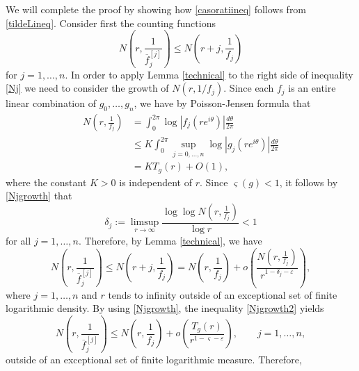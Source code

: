 \documentclass{amsart}
\theoremstyle{definition}
\numberwithin{equation}{section}
\numberwithin{theorem}{section}
\begin{document}
We will complete the proof by showing how \eqref{casoratiineq} follows from \eqref{tildeLineq}. Consider first the counting functions
    \begin{equation}\label{Nj}
    N\left(r,\frac{1}{\overline{f}_j^{[j]}}\right) \leq N\left(r+j,\frac{1}{f_j}\right)
    \end{equation}
for $j=1,\ldots,n$. In order to apply Lemma \ref{technical} to the right side of inequality \eqref{Nj} we need to consider the growth of $N(r,1/f_j)$. Since each $f_j$ is an entire linear combination of $g_0,\ldots,g_n$, we have by Poisson-Jensen formula that
    \begin{equation}\label{Njgrowth}
    \begin{split}
    N\left(r,\frac{1}{f_j}\right)&=\int_0^{2\pi}\log|f_j(re^{i\theta})|\frac{d\theta}{2\pi}\\
    &\leq K \int_0^{2\pi}\sup_{j=0,\ldots,n}\log|g_j(re^{i\theta})|\frac{d\theta}{2\pi}\\
    &=K T_g(r)+O(1),
    \end{split}
    \end{equation}
where the constant $K>0$ is independent of $r$. Since $\varsigma(g)<1$, it follows by \eqref{Njgrowth} that
    $$
    \delta_j := \limsup_{r\to\infty} \frac{\log\log N\left(r,\frac{1}{f_j}\right)}{\log r}<1
    $$
for all $j=1,\ldots,n$. Therefore, by Lemma \ref{technical}, we have
    \begin{equation}\label{Njgrowth2}
    N\left(r,\frac{1}{\overline{f}_j^{[j]}}\right) \leq N\left(r+j,\frac{1}{f_j}\right) = N\left(r,\frac{1}{f_j}\right) + o\left(\frac{N\left(r,\frac{1}{f_j}\right)}{r^{1-\delta_j-\varepsilon}}\right),
    \end{equation}
where $j=1,\ldots,n$ and $r$ tends to infinity outside of an exceptional set of finite logarithmic density.  By using \eqref{Njgrowth}, the inequality \eqref{Njgrowth2} yields
    \begin{equation*}
    N\left(r,\frac{1}{\overline{f}_j^{[j]}}\right)\leq  N\left(r,\frac{1}{f_j}\right)     + o\left(\frac{T_g(r)}{r^{1-\varsigma-\varepsilon}}\right), \qquad j=1,\ldots,n,
    \end{equation*}
outside of an exceptional set of finite logarithmic measure. Therefore,
\end{document}
